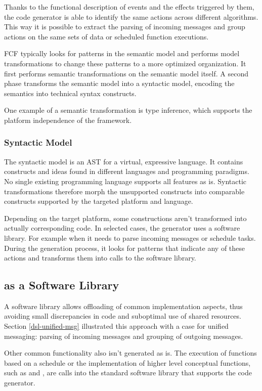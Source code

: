\documentclass[conference]{IEEEtran}
\begin{document}
Thanks to the functional description of events and the effects triggered by
them, the code generator is able to identify the same actions across different
algorithms. This way it is possible to extract the parsing of incoming messages
and group actions on the same sets of data or scheduled function executions.

FCF typically looks for patterns in the semantic model and performs model
transformations to change these patterns to a more optimized organization. It
first performs semantic transformations on the semantic model itself. A second
phase transforms the semantic model into a syntactic model, encoding the
semantics into technical syntax constructs.

One example of a semantic transformation is type inference, which supports the
platform independence of the framework.

\subsubsection{Syntactic Model}

The syntactic model is an AST for a virtual, expressive language. It contains
constructs and ideas found in different languages and programming paradigms. No
single existing programming language supports all features as is. Syntactic
transformations therefore morph the unsupported constructs into comparable
constructs supported by the targeted platform and language.

Depending on the target platform, some constructions aren't transformed into
actually corresponding code. In selected cases, the generator uses a software
library. For example when it needs to parse incoming messages or schedule
tasks. During the generation process, it looks for patterns that indicate any
of these actions and transforms them into calls to the \NAME software library.

\subsection{\NAME as a Software Library}
\label{software-lib-design}

A software library allows offloading of common implementation aspects, thus
avoiding small discrepancies in code and suboptimal use of shared resources.
Section \ref{dsl-unified-msg} illustrated this approach with a case for unified
messaging: parsing of incoming messages and grouping of outgoing messages.

Other common functionality also isn't generated as is. The execution of
functions based on a schedule or the implementation of higher level conceptual
functions, such as  and , are calls into the standard
software library that supports the code generator.
\end{document}
